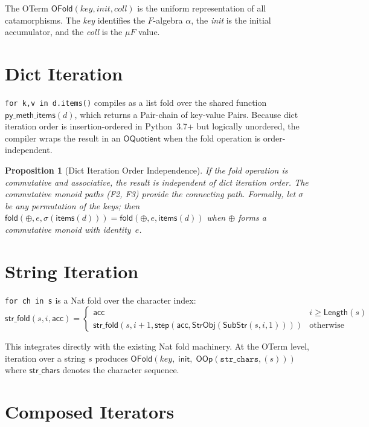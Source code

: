 \documentclass[11pt,a4paper]{report}
\theoremstyle{definition}
\theoremstyle{plain}
\newtheorem{proposition}[definition]{Proposition}
\newcommand{\fold}{\mathsf{fold}}
\begin{document}
The OTerm $\mathsf{OFold}(\mathit{key}, \mathit{init}, \mathit{coll})$
is the uniform representation of all catamorphisms.  The \emph{key}
identifies the $F$-algebra $\alpha$, the \emph{init} is the initial
accumulator, and the \emph{coll} is the $\mu F$ value.

\section{Dict Iteration}

\texttt{for k,v in d.items()} compiles as a list fold over the shared
function $\mathsf{py\_meth\_items}(d)$, which returns a Pair-chain of
key-value Pairs.  Because dict iteration order is insertion-ordered in
Python~3.7+ but logically unordered, the compiler wraps the result in
an $\mathsf{OQuotient}$ when the fold operation is order-independent.

\begin{proposition}[Dict Iteration Order Independence]
If the fold operation is commutative and associative, the result is
independent of dict iteration order.  The commutative monoid paths
(F2, F3) provide the connecting path.  Formally, let $\sigma$ be any
permutation of the keys; then
$\fold(\oplus, e, \sigma(\mathsf{items}(d)))
= \fold(\oplus, e, \mathsf{items}(d))$
when $\oplus$ forms a commutative monoid with identity~$e$.
\end{proposition}

\section{String Iteration}

\texttt{for ch in s} is a Nat fold over the character index:
$\mathsf{str\_fold}(s, i, \mathsf{acc}) = \begin{cases}
\mathsf{acc} & i \geq \mathsf{Length}(s) \\
\mathsf{str\_fold}(s, i{+}1, \mathsf{step}(\mathsf{acc},
  \mathsf{StrObj}(\mathsf{SubStr}(s, i, 1)))) & \text{otherwise}
\end{cases}$

This integrates directly with the existing Nat fold machinery.
At the OTerm level, iteration over a string $s$ produces
$\mathsf{OFold}(\mathit{key},\; \mathsf{init},\;
\mathsf{OOp}(\texttt{str\_chars}, (s)))$
where $\mathsf{str\_chars}$ denotes the character sequence.

\section{Composed Iterators}
\end{document}

